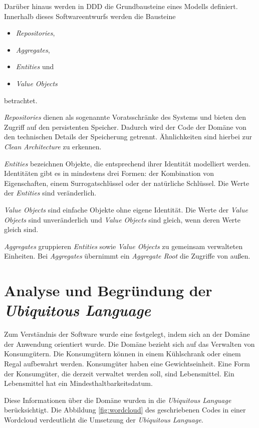 Darüber hinaus werden in \ac{DDD} die Grundbausteine eines Modells definiert.
Innerhalb dieses Softwareentwurfs werden die Bausteine 
\begin{itemize}
    \item \textit{Repositories}, 
    \item \textit{Aggregates},
    \item \textit{Entities} und
    \item \textit{Value Objects}
\end{itemize}
betrachtet.

\textit{Repositories} dienen als sogenannte \glqq Voratsschränke\grqq{} des Systems und bieten den Zugriff auf den persistenten Speicher.
Dadurch wird der Code der Domäne von den technischen Details der Speicherung getrennt.
Ähnlichkeiten sind hierbei zur \textit{Clean Architecture} zu erkennen.

\textit{Entities} bezeichnen Objekte, die entsprechend ihrer Identität modelliert werden.
Identitäten gibt es in mindestens drei Formen: der Kombination von Eigenschaften, einem Surrogatschlüssel oder der natürliche Schlüssel.
Die Werte der \textit{Entities} sind veränderlich.

\textit{Value Objects} sind einfache Objekte ohne eigene Identität.
Die Werte der \textit{Value Objects} sind unveränderlich und \textit{Value Objects} sind gleich, wenn deren Werte gleich sind.

\textit{Aggregates} gruppieren \textit{Entities} sowie \textit{Value Objects} zu gemeinsam verwalteten Einheiten.
Bei \textit{Aggregates} übernimmt ein \textit{Aggregate Root} die Zugriffe von außen.

\section{Analyse und Begründung der \textit{Ubiquitous Language}}
Zum Verständnis der Software wurde eine  festgelegt, indem sich an der Domäne der Anwendung orientiert wurde.
Die Domäne bezieht sich auf das Verwalten von Konsumgütern.
Die Konsumgütern können in einem Kühlschrank oder einem Regal aufbewahrt werden.
Konsumgüter haben eine Gewichtseinheit.
Eine Form der Konsumgüter, die derzeit verwaltet werden soll, sind Lebensmittel.
Ein Lebensmittel hat ein Mindesthaltbarkeitsdatum.

Diese Informationen über die Domäne wurden in die \textit{Ubiquitous Language} berücksichtigt.
Die Abbildung \ref{fig:wordcloud} des geschriebenen Codes in einer Wordcloud verdeutlicht die Umsetzung der \textit{Ubiquitous Language}.

